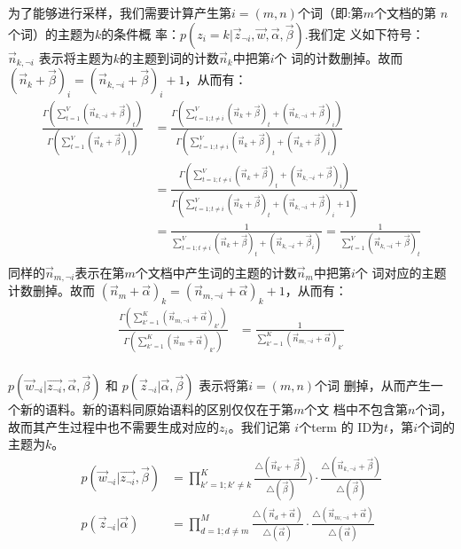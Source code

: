 为了能够进行采样，我们需要计算产生第$i=(m,n)$个词（即:第$m$个文档的第
$n$个词）的主题为$k$的条件概
率：$p(z_i=k|\vec{z}_{\neg i}, \vec{w},\vec{\alpha}, \vec{\beta})$.我们定
义如下符号：
$\vec{n}_{k, \neg i}$ 表示将主题为$k$的主题到词的计数$\vec{n}_k$中把第$i$个
词的计数删掉。故而 $(\vec{n}_{k}+\vec{\beta})_i = (\vec{n}_{k, \neg i}+\vec{\beta})_i + 1$，从而有：
\begin{displaymath}
\begin{split}
\frac{\Gamma(\sum_{t=1}^{V}{(\vec{n}_{k, \neg i}+\vec{\beta})_t})  }{ 
       \Gamma(\sum_{t=1}^{V}{(\vec{n}_{k}+\vec{\beta})_t})} 
&= \frac{
     \Gamma(\sum_{t=1; t \neq i}^{V}{(\vec{n}_{k}+\vec{\beta})_t}  
       + (\vec{n}_{k, \neg i}+\vec{\beta})_i)
}{ \Gamma(\sum_{t=1; t \neq i}^{V}{(\vec{n}_{k}+\vec{\beta})_t}
    + (\vec{n}_{k}+\vec{\beta})_i
)} \\
&=  \frac{
     \Gamma(\sum_{t=1; t \neq i}^{V}{(\vec{n}_{k}+\vec{\beta})_t}  
       + (\vec{n}_{k, \neg i}+\vec{\beta})_i)
}{ \Gamma(\sum_{t=1; t \neq i}^{V}{(\vec{n}_{k}+\vec{\beta})_t}
    + (\vec{n}_{k, \neg i}+\vec{\beta})_i +1
)} \\
&=  \frac{1}{\sum_{t=1; t \neq i}^{V}{(\vec{n}_{k}+\vec{\beta})_t}
    + (\vec{n}_{k, \neg i}+\vec{\beta}_i)
} =  \frac{1}{\sum_{t=1}^{V}{(\vec{n}_{k, \neg i}+\vec{\beta})_t}
} \\
\end{split}
\end{displaymath}
同样的$\vec{n}_{m, \neg i}$表示在第$m$个文档中产生词的主题的计数$\vec{n}_m$中把第$i$个
词对应的主题计数删掉。故而 $(\vec{n}_{m}+\vec{\alpha})_k =
(\vec{n}_{m, \neg i}+\vec{\alpha})_k + 1$，从而有：
\begin{displaymath}
\begin{split}
\frac{ \Gamma(\sum_{k'=1}^{K}{(\vec{n}_{m, \neg i}+\vec{\alpha})_{k'}})
}{     \Gamma(\sum_{k'=1}^{K}{(\vec{n}_{m}+\vec{\alpha})_{k'}}) 
}
&=  \frac{1}{\sum_{k'=1}^{K}{(\vec{n}_{m, \neg i}+\vec{\alpha})_{k'}}
} \\
\end{split}
\end{displaymath}

$p(\vec{w}_{\neg i}| \vec{z_{\neg i}}, \vec{\alpha},\vec{\beta})$ 和
$p(\vec{z}_{\neg i}|\vec{\alpha}, \vec{\beta})$ 表示将第$i=(m,n)$个词
删掉，从而产生一个新的语料。新的语料同原始语料的区别仅仅在于第$m$个文
档中不包含第$n$个词，故而其产生过程中也不需要生成对应的$z_i$。我们记第
$i$个term 的 ID为$t$，第$i$个词的主题为$k$。
\begin{displaymath}
\begin{split}
p(\vec{w}_{\neg i}| \vec{z_{\neg i}}, \vec{\beta}) &= 
\prod_{k'=1;k' \neq k}^{K}{
       \frac{\triangle(\vec{n}_{k'}+\vec{\beta})}
            {\triangle(\vec{\beta})}})
\cdot
 \frac{\triangle(\vec{n}_{k, \neg i}+\vec{\beta})}
      {\triangle(\vec{\beta})}\\
p(\vec{z}_{\neg i}|\vec{\alpha}) &=
\prod_{d=1; d \neq m}^{M}{\frac{\triangle(\vec{n}_d+\vec{\alpha})}
                  {\triangle(\vec{\alpha})}}
       \cdot
\frac{\triangle(\vec{n}_{m; \neg i}+\vec{\alpha})}
     {\triangle(\vec{\alpha})}
\end{split}
\end{displaymath}

